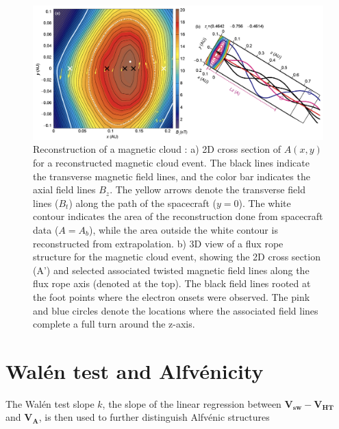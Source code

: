 \begin{figure}
    \centering
    \includegraphics[width=\textwidth]{Figures/Reconstructions/Hu2015_GSreconstruction.png}
    \caption[GS 2D reconstruction of a magnetic cloud]{Reconstruction of a magnetic cloud \citep{Hu:2015}: a) 2D cross section of $A(x,y)$ for a reconstructed magnetic cloud event. The black lines indicate the transverse magnetic field lines, and the color bar indicates the axial field lines $B_z$. The yellow arrows denote the transverse field lines ($B_t$) along the path of the spacecraft ($y=0$). The white contour indicates the area of the reconstruction done from spacecraft data ($A=A_b$), while the area outside the white contour is reconstructed from extrapolation. b) 3D view of a flux rope structure for the magnetic cloud event, showing the 2D cross section (A') and selected associated twisted magnetic field lines along the flux rope axis (denoted at the top). The black field lines  rooted at the foot points where the electron onsets were observed. The pink and blue circles denote the locations where the associated field lines complete a full turn around the z-axis.}
    \label{fig:GSreconstruction_Hu2015}
\end{figure}


\section{Wal\'en test and Alfv\'enicity}
The Wal\'en test slope $k$, the slope of the linear regression between $\mathbf{V_{sw}} - \mathbf{V_{HT}}$ and $\mathbf{V_A}$, is then used to further distinguish Alfv\'enic structures

